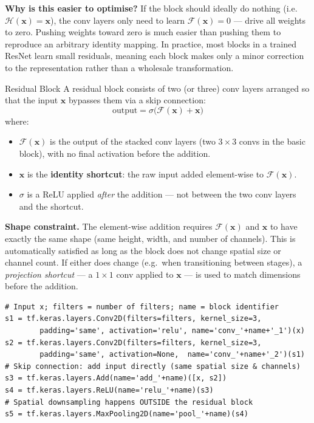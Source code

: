 \documentclass[11pt,a4paper]{article}
\newcommand{\term}[1]{\textcolor{DefGreen}{\textbf{#1}}}
\begin{document}
\medskip
\textbf{Why is this easier to optimise?} If the block should ideally do nothing (i.e.\ $\mathcal{H}(\mathbf{x}) = \mathbf{x}$), the conv layers only need to learn $\mathcal{F}(\mathbf{x}) = 0$ — drive all weights to zero. Pushing weights toward zero is much easier than pushing them to reproduce an arbitrary identity mapping. In practice, most blocks in a trained ResNet learn small residuals, meaning each block makes only a minor correction to the representation rather than a wholesale transformation.

\begin{defbox}{Residual Block}
A residual block consists of two (or three) conv layers arranged so that the input $\mathbf{x}$ bypasses them via a skip connection:
\[
  \text{output} = \sigma\!\bigl(\mathcal{F}(\mathbf{x}) + \mathbf{x}\bigr)
\]
where:
\begin{itemize}
  \item $\mathcal{F}(\mathbf{x})$ is the output of the stacked conv layers (two $3\times3$ convs in the basic block), with no final activation before the addition.
  \item $\mathbf{x}$ is the \term{identity shortcut}: the raw input added element-wise to $\mathcal{F}(\mathbf{x})$.
  \item $\sigma$ is a ReLU applied \emph{after} the addition — not between the two conv layers and the shortcut.
\end{itemize}

\medskip
\textbf{Shape constraint.} The element-wise addition requires $\mathcal{F}(\mathbf{x})$ and $\mathbf{x}$ to have exactly the same shape (same height, width, and number of channels). This is automatically satisfied as long as the block does not change spatial size or channel count. If either does change (e.g.\ when transitioning between stages), a \emph{projection shortcut} — a $1\times1$ conv applied to $\mathbf{x}$ — is used to match dimensions before the addition.
\end{defbox}

\begin{lstlisting}[caption={Residual block in Keras (same spatial size, same channels)}]
# Input x; filters = number of filters; name = block identifier
s1 = tf.keras.layers.Conv2D(filters=filters, kernel_size=3,
        padding='same', activation='relu', name='conv_'+name+'_1')(x)
s2 = tf.keras.layers.Conv2D(filters=filters, kernel_size=3,
        padding='same', activation=None,  name='conv_'+name+'_2')(s1)
# Skip connection: add input directly (same spatial size & channels)
s3 = tf.keras.layers.Add(name='add_'+name)([x, s2])
s4 = tf.keras.layers.ReLU(name='relu_'+name)(s3)
# Spatial downsampling happens OUTSIDE the residual block
s5 = tf.keras.layers.MaxPooling2D(name='pool_'+name)(s4)
\end{lstlisting}
\end{document}
